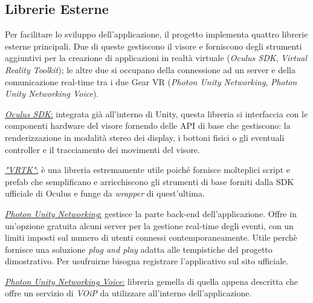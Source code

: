 \subsection{Librerie Esterne}
Per facilitare lo sviluppo dell'applicazione, il progetto implementa quattro librerie esterne principali. Due di queste gestiscono il visore e forniscono degli strumenti aggiuntivi per la creazione di applicazioni in realtà virtuale (\textit{Oculus SDK}, \textit{Virtual Reality Toolkit}); le altre due si occupano della connessione ad un server e della comunicazione real-time tra i due Gear VR (\textit{Photon Unity Networking}, \textit{Photon Unity Networking Voice}).\\

\begin{flushleft}
	\underline{\textit{Oculus SDK}:}
	integrata già all'interno di Unity, questa libreria si interfaccia con le componenti hardware del visore fornendo delle API di base che gestiscono: la renderizzazione in modalità stereo dei display, i bottoni fisici o gli eventuali controller e il tracciamento dei movimenti del visore. \cite{OculusDoc}
\end{flushleft}

\begin{flushleft}
	\underline{\textit{"VRTK"}:}
	è una libreria estremamente utile poiché fornisce molteplici script e prefab che semplificano e arricchiscono gli strumenti di base forniti dalla SDK ufficiale di Oculus e funge da \textit{wrapper} di quest'ultima.
	\cite{VRTK}
\end{flushleft}

\begin{flushleft}
	\underline{\textit{Photon Unity Networking}:}
	gestisce la parte back-end dell'applicazione. Offre in un'opzione gratuita alcuni server per la gestione real-time degli eventi, con un limiti imposti sul numero di utenti connessi contemporaneamente. Utile perchè fornisce una soluzione \textit{plug and play} adatta alle tempistiche del progetto dimostrativo. Per usufruirne bisogna registrare l'applicativo sul sito ufficiale.
	\cite{VRTK}
\end{flushleft}

\begin{flushleft}
	\underline{\textit{Photon Unity Networking Voice}:}
	libreria gemella di quella appena descritta che offre un servizio di \textit{VOiP} da utilizzare all'interno dell'applicazione.
	\cite{Photon}
\end{flushleft}

